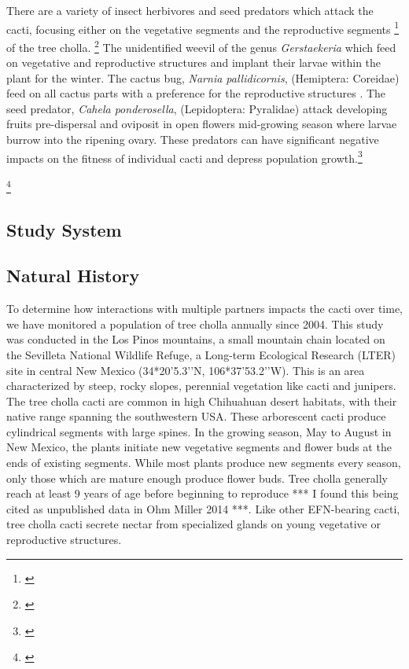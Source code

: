 \documentclass[12pt,a4paper]{article}
\newcommand{\tom}[2]{{\color{red}{#1}}\footnote{\textit{\color{red}{#2}}}}
\begin{document}
There are a variety of insect herbivores and seed predators which attack the cacti, focusing either on the vegetative segments and the reproductive segments \tom{throughout the entire range}{range info not really pertinent} of the tree cholla\cite{Mann1969}. 
\tom{More locally, at the Sevilleta, there are several insects which occur commonly on these cacti.
These include an unidentified weevil, a cactus bug, and a seed predator. }{Notice how these sentences add no information to the paragraph.}
The unidentified weevil of the genus \textit{Gerstaekeria} which feed on vegetative and reproductive structures and implant their larvae within the plant for the winter. 
The cactus bug, \textit{Narnia pallidicornis}, (Hemiptera: Coreidae) feed on all cactus parts with a preference for the reproductive structures \cite{Miller2006}.
The seed predator, \textit{Cahela ponderosella}, (Lepidoptera: Pyralidae) attack developing fruits pre-dispersal and oviposit in open flowers mid-growing season where larvae burrow into the ripening ovary. 
These predators can have significant negative impacts on the fitness of individual cacti and depress population growth\cite{Miller2009}.\tom{}{I think it is also important to summarize what is known about ant defense against these insects from previous papers. The fact that we have experimental evidence that ants provide defense is important to include, because your data are all observational.} 

\tom{\section*{Methods}}{Some duplication here...?}
\subsection*{Study System}
\subsection*{Natural History}
To determine how interactions with multiple partners impacts the cacti over time, we have monitored a population of tree cholla annually since 2004. 
This study was conducted in the Los Pinos mountains, a small mountain chain located on the Sevilleta National Wildlife Refuge, a Long-term Ecological Research (LTER) site in central New Mexico (34*20’5.3’’N, 106*37’53.2’’W).
This is an area characterized by steep, rocky slopes, perennial vegetation like cacti and junipers. 
The tree cholla cacti are common in high Chihuahuan desert habitats, with their native range spanning the southwestern USA\cite{Benson1982}. 
These arborescent cacti produce cylindrical segments with large spines. 
In the growing season, May to August in New Mexico, the plants initiate new vegetative segments and flower buds at the ends of existing segments. 
While most plants produce new segments every season, only those which are mature enough produce flower buds. 
Tree cholla generally reach at least 9 years of age before beginning to reproduce *** I found this being cited as unpublished data in Ohm Miller 2014 ***. 
Like other EFN-bearing cacti, tree cholla cacti secrete nectar from specialized glands on young vegetative or reproductive structures\cite{Ness2006,Oliveira1999}.
\end{document}
